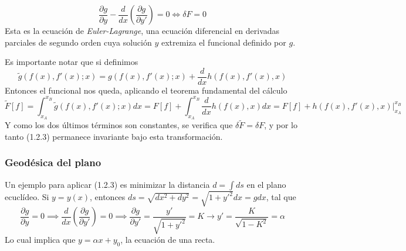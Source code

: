 \vspace{-20pt}
\Large\begin{equation} \label{1.2.3}
    \boxed{\frac{\partial g}{\partial y} -\frac{d}{dx}\left(\frac{\partial g}{\partial y'}\right) =0} \iff \delta F =0
\end{equation} \normalsize
Esta es la ecuación de \textit{Euler-Lagrange}, una ecuación diferencial en derivadas parciales de segundo orden cuya solución $y$ extremiza el funcional definido por $g$.

Es importante notar que si definimos
\begin{equation} \label{1.2.2}
    \tilde{g}(f(x),f'(x);x) = g(f(x),f'(x);x) + \frac{d}{dx} h(f(x),f'(x),x)
\end{equation} 
Entonces el funcional nos queda, aplicando el teorema fundamental del cálculo
\begin{equation} \label{1.2.2}
    \tilde{F}[f]=\int_{x_A}^{x_B}{\tilde{g}(f(x),f'(x);x)dx}=F[f] +\int_{x_A}^{x_B}{\frac{d}{dx} h(f(x),x) dx} = F[f] + h(f(x),f'(x),x)|_{x_A}^{x_B}
\end{equation} 
Y como los dos últimos términos son constantes, se verifica que $\delta \tilde{F} = \delta F$, y por lo tanto (1.2.3) permanece invariante bajo esta transformación.
\subsubsection{Geodésica del plano}
Un ejemplo para aplicar (1.2.3) es minimizar la distancia $d=\int{ds}$ en el plano ecuclídeo. Si $y=y(x)$, entonces $ds=\sqrt{dx^2+dy^2}=\sqrt{1+y'^2}dx=g dx$, tal que
\[\frac{\partial g}{\partial y}=0 \implies \frac{d}{dx}\left(\frac{\partial g}{\partial y'}\right)=0 \implies \frac{\partial g}{\partial y'} = \frac{y'}{\sqrt{1+y'^2}}= K \rightarrow y' = \frac{K}{\sqrt{1-K^2}}=\alpha\]
Lo cual implica que $y=\alpha x + y_0$, la ecuación de una recta.
\newpage
